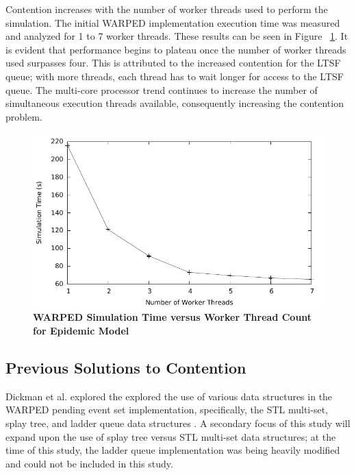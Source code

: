 \documentclass[a4paper]{article}
\begin{document}
Contention increases with the number of worker threads used to perform the
simulation.  The initial WARPED implementation execution time was measured and
analyzed for 1 to 7 worker threads.  These results can be seen in Figure
~\ref{fig:notsx_profile}.  It is evident that performance begins to plateau once
the number of worker threads used surpasses four.  This is attributed to the
increased contention for the LTSF queue; with more threads, each thread has to
wait longer for access to the LTSF queue.  The multi-core processor trend
continues to increase the number of simultaneous execution threads available,
consequently increasing the contention problem.
\par

\begin{figure}[H]
    \centering
    \graphicspath{ {./figures/} }
    \includegraphics[width=\textwidth,height=\textheight,keepaspectratio]{notsx_profile}
    \caption{\textbf{WARPED Simulation Time versus Worker Thread Count for
    Epidemic Model}}
    \label{fig:notsx_profile}
\end{figure}

\subsection{\textbf{Previous Solutions to Contention}}

Dickman et al. explored the explored the use of various data structures in the
WARPED pending event set implementation, specifically, the STL multi-set, splay
tree, and ladder queue data structures \cite{dickman}.  A secondary focus of
this study will expand upon the use of splay tree versus STL multi-set data
structures; at the time of this study, the ladder queue implementation was being
heavily modified and could not be included in this study.
\par
\end{document}
